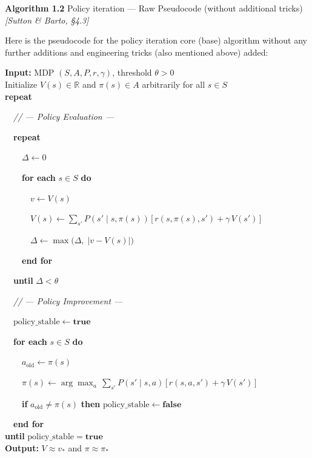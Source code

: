 \documentclass[11pt]{article}
\begin{document}
    \label{pseudo-1-2}

    \begin{pseudobox}

\textbf{Algorithm 1.2} Policy iteration --- Raw Pseudocode (without
additional tricks) \emph{{[}Sutton \& Barto, §4.3{]}}

\tcbline

Here is the pseudocode for the policy iteration core (base) algorithm
without any further additions and engineering tricks (also mentioned
above) added:

\textbf{Input:} MDP \((S, A, P, r, \gamma)\), threshold \(\theta > 0\)\\
Initialize \(V(s) \in \mathbb{R}\) and \(\pi(s) \in A\) arbitrarily for
all \(s \in S\)\\
\textbf{repeat}\\
\strut ~~\emph{// --- Policy Evaluation ---}\\
\strut ~~\textbf{repeat}\\
\strut ~~~~\(\Delta \leftarrow 0\)\\
\strut ~~~~\textbf{for each} \(s \in S\) \textbf{do}\\
\strut ~~~~~~\(v \leftarrow V(s)\)\\
\strut ~~~~~~\(V(s) \leftarrow \sum_{s'} P(s' \mid s, \pi(s))\,\bigl[\, r(s, \pi(s), s') + \gamma\, V(s') \,\bigr]\)\\
\strut ~~~~~~\(\Delta \leftarrow \max\!\bigl(\Delta,\; |v - V(s)|\bigr)\)\\
\strut ~~~~\textbf{end for}\\
\strut ~~\textbf{until} \(\Delta < \theta\)\\
\strut ~~\emph{// --- Policy Improvement ---}\\
\strut ~~\(\text{policy\_stable} \leftarrow \mathbf{true}\)\\
\strut ~~\textbf{for each} \(s \in S\) \textbf{do}\\
\strut ~~~~\(a_{\text{old}} \leftarrow \pi(s)\)\\
\strut ~~~~\(\pi(s) \leftarrow \arg\max_{a}\, \sum_{s'} P(s' \mid s, a)\,\bigl[\, r(s, a, s') + \gamma\, V(s') \,\bigr]\)\\
\strut ~~~~\textbf{if} \(a_{\text{old}} \neq \pi(s)\) \textbf{then}
\(\text{policy\_stable} \leftarrow \mathbf{false}\)\\
\strut ~~\textbf{end for}\\
\textbf{until} \(\text{policy\_stable} = \mathbf{true}\)\\
\textbf{Output:} \(V \approx v_{*}\) and \(\pi \approx \pi_{*}\)

\end{pseudobox}
\end{document}
